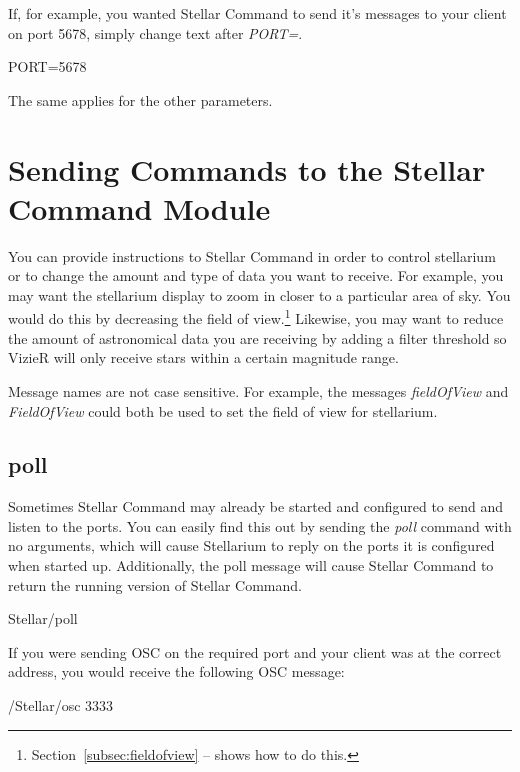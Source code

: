 If, for example, you wanted Stellar Command to send it's messages to your client on port 5678, simply change text after  \textit{PORT=}.
 \begin{syntax} 
	\medskip
	PORT=5678\\
	\medskip
\end{syntax}
\bigskip

The same applies for the other parameters.

\section{Sending Commands to the Stellar Command Module}
You can provide instructions to Stellar Command in order to control stellarium or to change the amount and type of data you want to receive. For example, you may want the stellarium display to zoom in closer to a particular area of sky. You would do this by decreasing the field of view.\footnote{Section~\ref{subsec:fieldofview} --
	\emph{} shows how to do this.} Likewise, you may want to reduce the amount of astronomical data you are receiving by adding a filter threshold so VizieR will only receive stars within a certain magnitude range. 

Message names are not case sensitive. For example, the messages \textit{fieldOfView} and \textit{FieldOfView} could both be used to set the field of view for stellarium.

\subsection{poll}  \label{sec:poll}   
Sometimes Stellar Command may already be started and configured to send and listen to the ports. You can easily find this out by sending the \textit{poll} command with no arguments, which will cause Stellarium to reply on the ports it is configured when started up. Additionally, the poll message will cause Stellar Command to return the running version of Stellar Command.

 \begin{syntax}
	\medskip
	Stellar/poll
	\medskip
\end{syntax}

If you were sending OSC on the required port and your client was at the correct address, you would receive the following OSC message:
\begin{syntax}
	/Stellar/osc 3333  \\
\end{syntax}
\bigskip

